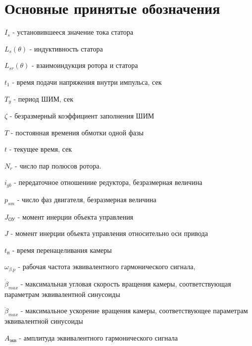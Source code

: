 \section{ Основные принятые обозначения }

$I_{s}$ - установившееся значение тока статора

$L_{s}(\theta)$ - индуктивность статора

$L_{sr}(\theta)$ - взаимоиндукция ротора и статора

$t_{1}$ - время подачи напряжения внутри импульса, сек

$T_{y}$ - период ШИМ, сек

$\zeta$ - безразмерный коэффициент заполнения ШИМ

$T$ - постоянная времения обмотки одной фазы

$t$ - текущее время, сек

$N_{r}$ - число пар полюсов ротора.

$i_{gb}$ - передаточное отношениие редуктора, безразмерная величина

$p_{sm}$ - число фаз двигателя, безразмерная величина

$J_{\text{ОУ}}$ - момент инерции объекта управления

$J$ - момент инерции объекта управления относительно оси привода

$t_\text{п}$ - время перенацеливания камеры

$\omega_{\beta.p}$ - рабочая частота эквивалентного гармонического сигнала,

$\dot{\beta}_{max}$ - максимальная угловая скорость вращения камеры, соответствующая параметрам эквивалентной синусоиды

$\ddot{\beta}_{max}$ - максимальное ускорение вращения камеры, соответствующее параметрам эквивалентной синусоиды

$A_\text{экв}$ - амплитуда эквивалентного гармонического сигнала
